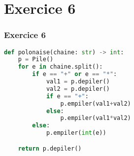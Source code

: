\documentclass[svgnames,11pt]{beamer}
\begin{document}
\section{Exercice 6}
\begin{frame}[fragile]
    \frametitle{Exercice 6}

\begin{lstlisting}[language=Python , basicstyle=\ttfamily\small, xleftmargin=0em, xrightmargin=0em]
def polonaise(chaine: str) -> int:
    p = Pile()
    for e in chaine.split():
        if e == "+" or e == "*":
            val1 = p.depiler()
            val2 = p.depiler()
            if e == "+":
                p.empiler(val1+val2)
            else:
                p.empiler(val1*val2)
        else:
            p.empiler(int(e))

    return p.depiler()
\end{lstlisting}

\end{frame}
\end{document}

